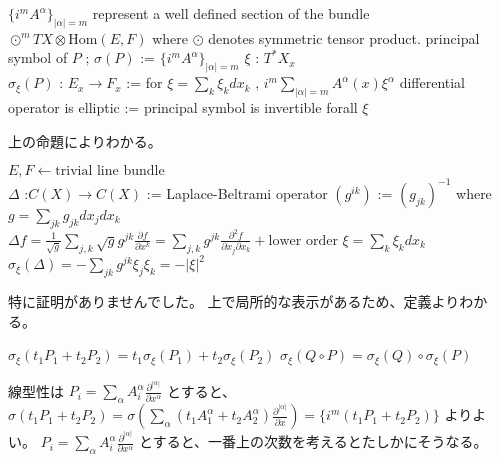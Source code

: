\begin{Definition}
\itemprop
  \Then \(\{i^m A^{\alpha}\}_{|\alpha|=m}\) represent a well defined section of the bundle \(\odot ^m TX \otimes \text{Hom}(E,F)\) where \(\odot\) denotes symmetric tensor product.
\itemdefi
  \Define principal symbol of \(P\) ; \(\sigma(P)\) := \(\{i^m A^{\alpha}\}_{| \alpha | = m}\)
\itemdefi
  \For \(\xi\) : \(T^*X_x\) \\
  \Define \(\sigma_{\xi}(P)\) : \(E_x \to F_x\) := for \(\xi = \sum_k \xi_k dx_k\) ,
  \(i^m \sum_{|\alpha| = m} A^\alpha(x) \xi^{\alpha}\)
\itemdefi
  \Define differential operator is elliptic := principal symbol is invertible forall \(\xi\)
\end{Definition}

\begin{Proof}
\itemprof
  上の命題によりわかる。
\end{Proof}

\begin{Theorem}
\itemwhen
  \Let \(E , F \leftarrow \text{trivial line bundle}\) \\
  \Let \(\Delta\) :\(C(X) \to C(X)\) := Laplace-Beltrami operator
\itemprop
  \Let \((g^{ik})\) := \((g_{jk})^{-1}\) where \(g = \sum_{jk} g_{jk} d x_j d x_k\) \\
  \Then \(\Delta f = \frac{1}{\sqrt{g}} \sum_{j,k} \sqrt{g} g^{jk} \frac{\partial f}{\partial x^k} = \sum_{j,k} g^{jk} \frac{\partial^2 f}{\partial x_j \partial x_k} + \text{lower order}\)
\itemprop
  \For \(\xi = \sum_k \xi_k d x_k\) \\
  \Then \(\sigma_{\xi}(\Delta) = - \sum_{jk} g^{jk} \xi_j \xi_k = - |\xi|^2\)
\end{Theorem}

\begin{Proof}
\itemprof
  \WIP 特に証明がありませんでした。
\itemprof
  上で局所的な表示があるため、定義よりわかる。
\end{Proof}

\begin{Theorem}
\itemprop
  \Then \(\sigma_{\xi}(t_1 P_1 + t_2 P_2) = t_1 \sigma_{\xi}(P_1) + t_2 \sigma_{\xi}(P_2)\)
\itemprop
  \Then \(\sigma_{\xi}(Q \circ P) = \sigma_{\xi}(Q) \circ \sigma_{\xi}(P)\)
\end{Theorem}

\begin{Proof}
\itemprof
  線型性は \(P_i = \sum_{\alpha} A_i^\alpha \frac{\partial^{|\alpha|}}{\partial x^{\alpha}}\) とすると、 \(\sigma(t_1 P_1 + t_2 P_2) = \sigma (\sum_{\alpha} (t_1 A_1^\alpha + t_2 A_2^\alpha) \frac{\partial^{|\alpha|}}{\partial x}) = \{i^m (t_1 P_1 + t_2 P_2)\}\) よりよい。
\itemprof
  \(P_i = \sum_{\alpha} A_i^\alpha \frac{\partial^{|\alpha|}}{\partial x^{\alpha}}\) とすると、一番上の次数を考えるとたしかにそうなる。
\end{Proof}

